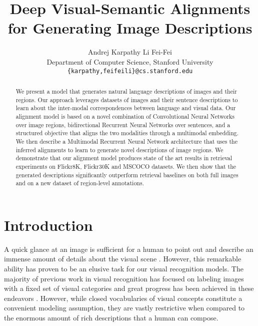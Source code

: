 \documentclass[10pt,twocolumn,letterpaper]{article}
\begin{document}

\title{Deep Visual-Semantic Alignments for Generating Image Descriptions}

\author{
Andrej Karpathy \hspace{0.4in} Li Fei-Fei\\
Department of Computer Science, Stanford University\\
\texttt{\small \{karpathy,feifeili\}@cs.stanford.edu}\\
}


\maketitle


\begin{abstract}
We present a model that generates natural language descriptions of images and their regions. Our approach leverages datasets of images and their sentence descriptions to learn about the inter-modal correspondences between language and visual data. Our alignment model is based on a novel combination of Convolutional Neural Networks over image regions, bidirectional Recurrent Neural Networks over sentences, and a structured objective that aligns the two modalities through a multimodal embedding. We then describe a Multimodal Recurrent Neural Network architecture that uses the inferred alignments to learn to generate novel descriptions of image regions. We demonstrate that our alignment model produces state of the art results in retrieval experiments on Flickr8K, Flickr30K and MSCOCO datasets. We then show that the generated descriptions significantly outperform retrieval baselines on both full images and on a new dataset of region-level annotations.
\end{abstract}



\vspace{-0.2in}
\section{Introduction}
\vspace{-0.1in}

A quick glance at an image is sufficient for a human to point out and describe an immense amount of details about the visual scene \cite{fei2007we}. However, this remarkable ability has proven to be an elusive task for our visual recognition models. The majority of previous work in visual recognition has focused on labeling images with a fixed set of visual categories and great progress has been achieved in these endeavors \cite{ilsvrc,Everingham10}. However, while closed vocabularies of visual concepts constitute a convenient modeling assumption, they are vastly restrictive when compared to the enormous amount of rich descriptions that a human can compose.
\end{document}
